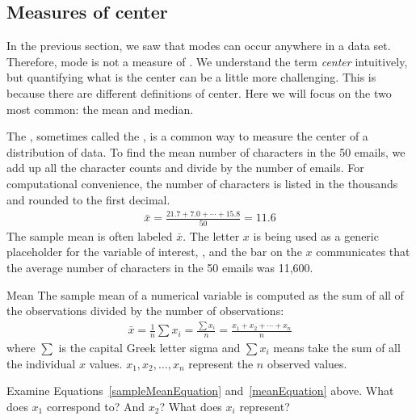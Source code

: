 \subsection{Measures of center}
\label{center}

In the previous section, we saw that modes can occur anywhere in a data set. Therefore, mode is not a measure of . We understand the term \emph{center} intuitively, but quantifying what is the center can be a little more challenging. This is because there are different definitions of center. Here we will focus on the two most common: the mean and median.

The , sometimes called the , is a common way to measure the center of a distribution of data. To find the mean number of characters in the 50 emails, we add up all the character counts and divide by the number of emails. For computational convenience, the number of characters is listed in the thousands and rounded to the first decimal.
\begin{eqnarray*}
\bar{x} = \frac{21.7 + 7.0 + \cdots + 15.8}{50} = 11.6
\label{sampleMeanEquation}
\end{eqnarray*}
The sample mean is often labeled $\bar{x}$. The letter $x$ is being used as a generic placeholder for the variable of interest, , and the bar on the $x$ communicates that the average number of characters in the 50 emails was 11,600.

\begin{onebox}{Mean}
The sample mean of a numerical variable is computed as the sum of all of the observations divided by the number of observations:
\begin{eqnarray*}
\bar{x} = \frac{1}{n}\sum{x_{i}} = \frac{\sum{x_i}}{n}=\frac{x_1+x_2+\cdots+x_n}{n}
\label{meanEquation}
\end{eqnarray*}
where $\sum$ is the capital Greek letter sigma and $\sum{x_{i}}$ means take the sum of all the individual $x$ values.
 $x_1, x_2, \dots, x_n$ represent the $n$ observed values.\end{onebox}

\begin{exercisewrap}
\begin{nexercise}
Examine Equations~\eqref{sampleMeanEquation} and~\eqref{meanEquation} above. What does $x_1$ correspond to? And $x_2$? What does $x_i$ represent?\footnotemark
\end{nexercise}
\end{exercisewrap}


